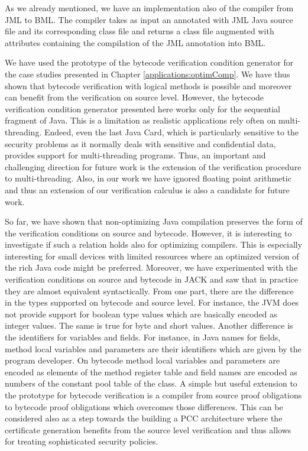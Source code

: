 As we already mentioned, we have an implementation also of the compiler from
JML to BML. The compiler takes as input an annotated with JML Java source file
and its corresponding class file and returns a class file augmented with
attributes containing the compilation of the JML annotation into BML.

 We have used the prototype of the bytecode verification condition generator
 for the case studies presented in Chapter \ref{applications:optimComp}. 
 We have thus shown that bytecode verification with logical methods is possible
 and moreover can benefit from the verification on source level. 
 However, the bytecode verification condition generator presented here works only for the
 sequential fragment of Java. This is a limitation  as realistic applications  
 rely often on multi-threading. Endeed, even the last Java Card, which is 
 particularly sensitive to the security problems as it normally deals with
 sensitive and confidential data,  provides support for
 multi-threading programs. Thus, an important and challenging direction for future work
 is the extension of the verification procedure to multi-threading. 
 Also, in our work we have ignored floating point arithmetic and thus an
 extension of our  verification calculus is also a candidate for future work.

So far, we have shown that non-optimizing Java compilation
 preserves the  form of the verification conditions on source and
 bytecode. However, it is interesting to investigate if such a relation  holds also  for
 optimizing compilers. This is especially  interesting for small devices with limited resources
  where an optimized version of the rich Java code might be preferred. 
Moreover, we have experimented with the verification conditions on source and
 bytecode in JACK and saw that in practice they are almost equivalent
 syntactically. From one part, there are the difference in the types 
 supported on bytecode and source level. For instance, the JVM does not
 provide support for boolean type values which are basically encoded as
 integer values. The same is true for byte and short values.  Another
 difference is the identifiers for variables and fields. For instance, in Java
 names for fields, method local variables and parameters are their identifiers which are given by the
 program developer. On bytecode method local variables and parameters are encoded as elements of the
 method register table and field names are encoded as numbers of the constant
 pool table of the class. A  simple but useful extension to the prototype for
 bytecode verification
 is a compiler from source proof obligations to bytecode proof obligations
 which overcomes those differences. This can be considered also as a step
 towards the  building a PCC architecture where the certificate generation benefits from
 the source level verification and thus allows for treating sophisticated
 security policies.
 

